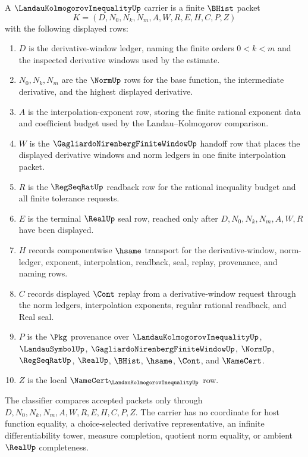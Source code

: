 \begin{definition}
\label{def:landau-kolmogorov-inequality-carrier}
A $\LandauKolmogorovInequalityUp$ carrier is a finite $\BHist$ packet
$$
K=(D,N_0,N_k,N_m,A,W,R,E,H,C,P,Z)
$$
with the following displayed rows:
\begin{enumerate}
\item $D$ is the derivative-window ledger, naming the finite orders $0<k<m$ and the inspected derivative windows used by the estimate.
\item $N_0,N_k,N_m$ are the $\NormUp$ rows for the base function, the intermediate derivative, and the highest displayed derivative.
\item $A$ is the interpolation-exponent row, storing the finite rational exponent data and coefficient budget used by the Landau--Kolmogorov comparison.
\item $W$ is the $\GagliardoNirenbergFiniteWindowUp$ handoff row that places the displayed derivative windows and norm ledgers in one finite interpolation packet.
\item $R$ is the $\RegSeqRatUp$ readback row for the rational inequality budget and all finite tolerance requests.
\item $E$ is the terminal $\RealUp$ seal row, reached only after $D,N_0,N_k,N_m,A,W,R$ have been displayed.
\item $H$ records componentwise $\hsame$ transport for the derivative-window, norm-ledger, exponent, interpolation, readback, seal, replay, provenance, and naming rows.
\item $C$ records displayed $\Cont$ replay from a derivative-window request through the norm ledgers, interpolation exponents, regular rational readback, and Real seal.
\item $P$ is the $\Pkg$ provenance over $\LandauKolmogorovInequalityUp$, $\LandauSymbolUp$, $\GagliardoNirenbergFiniteWindowUp$, $\NormUp$, $\RegSeqRatUp$, $\RealUp$, $\BHist$, $\hsame$, $\Cont$, and $\NameCert$.
\item $Z$ is the local $\NameCert_{\LandauKolmogorovInequalityUp}$ row.
\end{enumerate}
The classifier compares accepted packets only through $D,N_0,N_k,N_m,A,W,R,E,H,C,P,Z$. The carrier has no coordinate for host function equality, a choice-selected derivative representative, an infinite differentiability tower, measure completion, quotient norm equality, or ambient $\RealUp$ completeness.
\end{definition}

